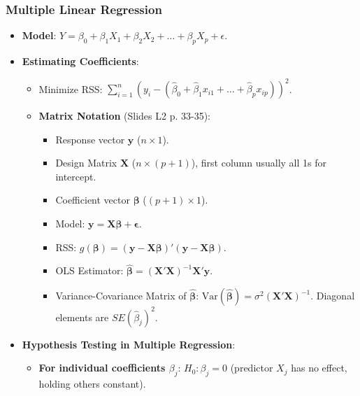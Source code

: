 \documentclass[12pt,a4paper]{article}
\begin{document}
\begin{itemize}
    \subsubsection{Multiple Linear Regression }
        \begin{itemize}
            \item \textbf{Model}: $Y = \beta_0 + \beta_1 X_1 + \beta_2 X_2 + \dots + \beta_p X_p + \epsilon$.
            \item \textbf{Estimating Coefficients}:
                \begin{itemize}
                    \item Minimize RSS: $\sum_{i=1}^{n} (y_i - (\hat{\beta}_0 + \hat{\beta}_1 x_{i1} + \dots + \hat{\beta}_p x_{ip}))^2$.
                    \item \textbf{Matrix Notation} (Slides L2 p. 33-35):
                        \begin{itemize}
                            \item Response vector $\mathbf{y}$ ($n \times 1$).
                            \item Design Matrix $\mathbf{X}$ ($n \times (p+1)$), first column usually all 1s for intercept.
                            \item Coefficient vector $\boldsymbol{\beta}$ ($(p+1) \times 1$).
                            \item Model: $\mathbf{y} = \mathbf{X}\boldsymbol{\beta} + \boldsymbol{\epsilon}$.
                            \item RSS: $g(\boldsymbol{\beta}) = (\mathbf{y} - \mathbf{X}\boldsymbol{\beta})' (\mathbf{y} - \mathbf{X}\boldsymbol{\beta})$.
                            \item OLS Estimator: $\hat{\boldsymbol{\beta}} = (\mathbf{X}'\mathbf{X})^{-1}\mathbf{X}'\mathbf{y}$.
                            \item Variance-Covariance Matrix of $\hat{\boldsymbol{\beta}}$: $\text{Var}(\hat{\boldsymbol{\beta}}) = \sigma^2 (\mathbf{X}'\mathbf{X})^{-1}$. Diagonal elements are $SE(\hat{\beta}_j)^2$.
                        \end{itemize}
                \end{itemize}
            \item \textbf{Hypothesis Testing in Multiple Regression}:
                \begin{itemize}
                    \item \textbf{For individual coefficients $\beta_j$}: $H_0: \beta_j=0$ (predictor $X_j$ has no effect, holding others constant).

\end{itemize}
\end{itemize}
\end{itemize}
\end{document}
